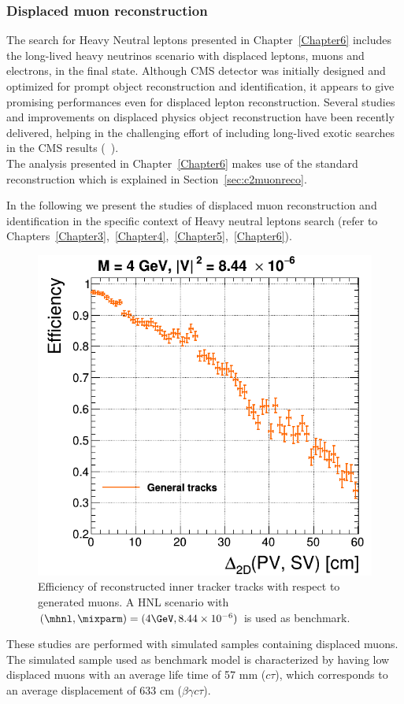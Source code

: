 \subsubsection{Displaced muon
  reconstruction}\label{sec:c2muondisplaced}
The search for Heavy Neutral leptons presented in
Chapter~\ref{Chapter6} includes the long-lived heavy
 neutrinos scenario with
displaced leptons, muons and electrons, in the final
state. Although CMS detector was initially designed and optimized for prompt
object reconstruction and identification, it appears to give
promising performances even for displaced lepton
reconstruction. Several studies and improvements on displaced physics object
reconstruction have been recently
delivered, helping in the challenging effort of including long-lived
exotic searches in the CMS results (~\cite{cmscollaboration2021search, Sirunyan_2019ll,
  Sirunyan_2019ll2, Sirunyan_2020ll, Sirunyan_2021ll,CMS:2021tkn}).\\

The analysis presented in Chapter~\ref{Chapter6} makes use of the
standard reconstruction which
 is explained in
Section~\ref{sec:c2muonreco}.

In the following we present the studies of displaced muon
reconstruction and identification in the specific context of Heavy
neutral leptons search (refer to
Chapters~\ref{Chapter3},~\ref{Chapter4},~\ref{Chapter5},~\ref{Chapter6}).

\begin{figure}
\centering
\includegraphics[width=.40\textwidth]{Figures/c6/object/tracking_M-4_V-0p00290516780927_rho.png}
  \caption{Efficiency of reconstructed inner tracker tracks with
    respect to generated muons. A HNL scenario with
    $(\mhnl,\mixparm)=(4\GeV,8.44\times10^{-6})$ is used as
    benchmark. \dani}
  \label{fig:c2tracking}
\end{figure}

These studies are performed with simulated samples containing
displaced muons. The simulated sample used as
benchmark model is characterized by having low \pt displaced muons with an
average life time of 57 mm ($c\tau$), which corresponds to an average
displacement of 633 cm ($\beta \gamma c \tau$).

